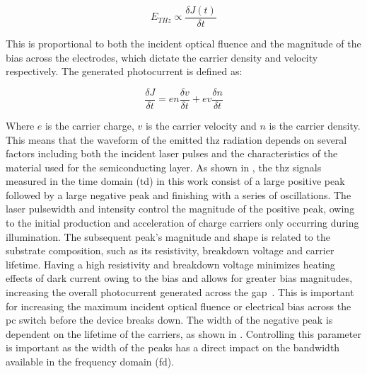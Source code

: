 \begin{equation}
E_{THz} \propto{\frac{\delta J(t)}{\delta t}}
\end{equation}

This is proportional to both the incident optical fluence and the magnitude of the bias across the electrodes, which dictate the carrier density and velocity respectively. The generated photocurrent is defined as:

\begin{equation}
\frac{\delta J}{\delta t} = en\frac{\delta v}{\delta t} + ev\frac{\delta n}{\delta t}
\end{equation}

Where \(e\) is the carrier charge, \(v\) is the carrier velocity and \(n\) is the carrier density. This means that the waveform of the emitted \acrshort{thz} radiation depends on several factors including both the incident laser pulses and the characteristics of the material used for the semiconducting layer. As shown in , the \acrshort{thz} signals measured in the time domain (\acrshort{td}) in this work consist of a large positive peak followed by a large negative peak and finishing with a series of oscillations. The laser pulsewidth and intensity control the magnitude of the positive peak, owing to the initial production and acceleration of charge carriers only occurring during illumination. The subsequent peak's magnitude and shape is related to the substrate composition, such as its resistivity, breakdown voltage and carrier lifetime. Having a high resistivity and breakdown voltage minimizes heating effects of dark current owing to the bias and allows for greater bias magnitudes, increasing the overall photocurrent generated across the gap~\cite{Warren1991, Tani1997_2}. This is important for increasing the maximum incident optical fluence or electrical bias across the \acrshort{pc} switch before the device breaks down. The width of the negative peak is dependent on the lifetime of the carriers, as shown in . Controlling this parameter is important as the width of the peaks has a direct impact on the bandwidth available in the frequency domain (\acrshort{fd}).

